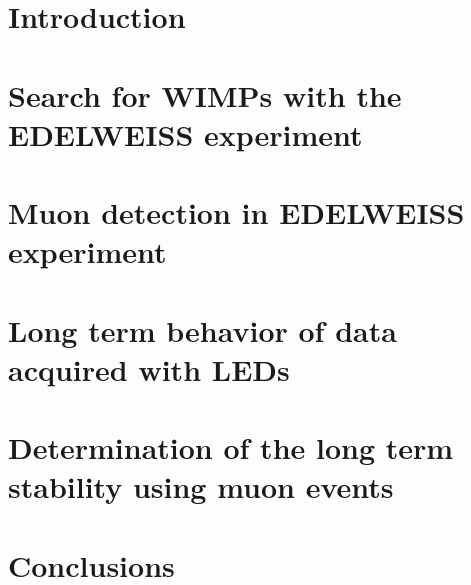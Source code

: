 \documentclass{include/thesisclass}
\begin{document}
    \FrontMatter

    
    

    \begingroup \let\clearpage\relax    %
    \tableofcontents                    %
    \endgroup
    \cleardoublepage



    \MainMatter

    \chapter{Introduction}
    \label{chap:intro}
    
    \chapter{Search for WIMPs with the EDELWEISS experiment}
    \label{chap:theo}
    
    \chapter{Muon detection in EDELWEISS experiment}
    \label{chap:muon}
    
    \chapter{Long term behavior of data acquired with LEDs}
    \label{chap:ana_led}
    
    \chapter{Determination of the long term stability using muon events }
    \label{chap:ana_muon}
    
    \chapter{Conclusions}
    \label{conclusion}
    





    \Appendix
    \chapter*{\appendixname} 
\end{document}
